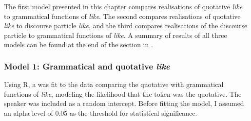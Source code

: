 The first model presented in this chapter compares realisations of quotative \textit{like} to grammatical functions of \textit{like}. The second compares realisations of quotative \textit{like} to discourse particle \textit{like}, and the third compares realisations of the discourse particle to grammatical functions of \textit{like}. A summary of results of all three models can be found at the end of the section in . 

\subsubsection{Model 1: Grammatical and quotative \textit{like}}

Using R, a  was fit to the data comparing the quotative with grammatical functions of \textit{like}, modeling the likelihood that the token was the quotative. The speaker was included as a random intercept. Before fitting the model, I assumed an alpha level of 0.05 as the threshold for statistical significance. 

